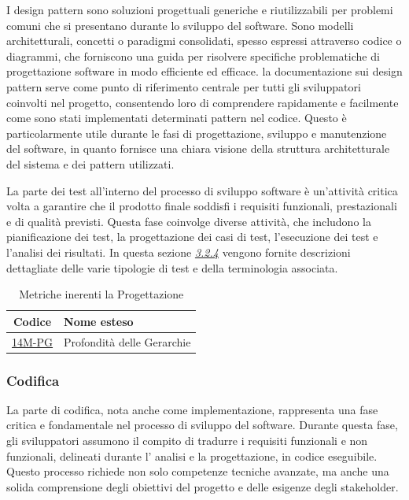 I design pattern  sono soluzioni progettuali generiche e riutilizzabili per problemi comuni che si presentano durante lo sviluppo del software. Sono modelli architetturali, concetti o paradigmi consolidati, spesso espressi attraverso codice o diagrammi, che forniscono una guida per risolvere specifiche problematiche di progettazione software in modo efficiente ed efficace. la documentazione sui design pattern serve come punto di riferimento centrale per tutti gli sviluppatori coinvolti nel progetto, consentendo loro di comprendere rapidamente e facilmente come sono stati implementati determinati pattern nel codice. Questo è particolarmente utile durante le fasi di progettazione, sviluppo e manutenzione del software, in quanto fornisce una chiara visione della struttura architetturale del sistema e dei pattern utilizzati.

La parte dei test all'interno del processo di sviluppo software è un'attività critica volta a garantire che il prodotto finale soddisfi i requisiti funzionali, prestazionali e di qualità previsti. Questa fase coinvolge diverse attività, che includono la pianificazione dei test, la progettazione dei casi di test, l'esecuzione dei test e l'analisi dei risultati. In questa sezione \hyperref[testing]{\textit{3.2.4}} vengono fornite descrizioni dettagliate delle varie tipologie di test e della terminologia associata.

\begin{table}[!h]
	\centering
	\begin{tabular}{ | c | l | }
		\hline
		\textbf{Codice}                     & \textbf{Nome esteso}       \\
		\hline
		\underline{\hyperlink{14M}{14M-PG}} & Profondità delle Gerarchie \\
		\hline
	\end{tabular}
	\caption{Metriche inerenti la Progettazione}
\end{table}


\subsubsection{Codifica}
La parte di codifica, nota anche come implementazione, rappresenta una fase critica e fondamentale nel processo di sviluppo del software. Durante questa fase, gli sviluppatori assumono il compito di tradurre i requisiti funzionali e non funzionali, delineati durante l' analisi e la progettazione, in codice eseguibile. Questo processo richiede non solo competenze tecniche avanzate, ma anche una solida comprensione degli obiettivi del progetto e delle esigenze degli stakeholder.

